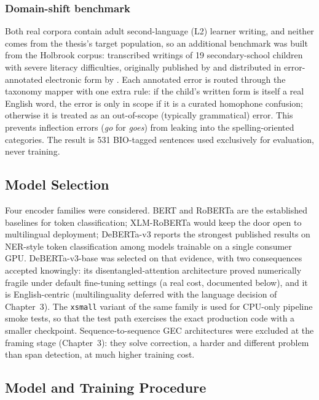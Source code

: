 \subsubsection{Domain-shift benchmark}

Both real corpora contain adult second-language (L2) learner writing, and neither comes from the thesis's target population, so an additional benchmark was built from the Holbrook corpus: transcribed writings of 19 secondary-school children with severe literacy difficulties, originally published by \textcite{Holbrook1964} and distributed in error-annotated electronic form by \textcite{Mitton1985}. Each annotated error is routed through the taxonomy mapper with one extra rule: if the child's written form is itself a real English word, the error is only in scope if it is a curated homophone confusion; otherwise it is treated as an out-of-scope (typically grammatical) error. This prevents inflection errors (\emph{go} for \emph{goes}) from leaking into the spelling-oriented categories. The result is 531 BIO-tagged sentences used exclusively for evaluation, never training.

\subsection{Model Selection}
\label{sec:impl_ling_modelsel}

Four encoder families were considered. BERT and RoBERTa \parencite{Devlin2019,Liu2019RoBERTa} are the established baselines for token classification; XLM-RoBERTa \parencite{Conneau2020} would keep the door open to multilingual deployment; DeBERTa-v3 \parencite{He2023DeBERTaV3} reports the strongest published results on NER-style token classification among models trainable on a single consumer GPU. DeBERTa-v3-base was selected on that evidence, with two consequences accepted knowingly: its disentangled-attention architecture proved numerically fragile under default fine-tuning settings (a real cost, documented below), and it is English-centric (multilinguality deferred with the language decision of Chapter~3). The \texttt{xsmall} variant of the same family is used for CPU-only pipeline smoke tests, so that the test path exercises the exact production code with a smaller checkpoint. Sequence-to-sequence GEC architectures were excluded at the framing stage (Chapter~3): they solve correction, a harder and different problem than span detection, at much higher training cost.

\subsection{Model and Training Procedure}
\label{sec:impl_ling_training}

